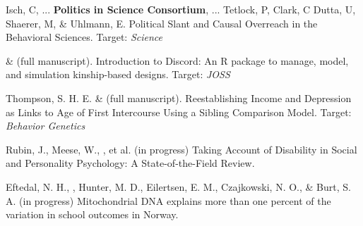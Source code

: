 \begin{etaremune}

\item  Isch, C, ... \textbf{Politics in Science Consortium}, ... Tetlock, P,  Clark, C   Dutta, U,  Shaerer, M, \&  Uhlmann, E. Political Slant and Causal Overreach in the Behavioral Sciences. Target: \textit{Science}

\item \jt \& \meb (full manuscript). Introduction to Discord: An R package to manage, model, and simulation kinship-based designs. Target: \textit{JOSS}


\item Thompson, S. H. E. \noteA \& \meb (full manuscript). Reestablishing Income and Depression as Links to Age of First Intercourse Using a Sibling Comparison Model. Target: \textit{Behavior Genetics}

\item Rubin, J., Meese, W., \meb, et al. (in progress) Taking Account of Disability in Social and Personality Psychology: A State-of-the-Field Review.

\item Eftedal, N. H., \meb, Hunter, M. D., Eilertsen, E. M., Czajkowski, N. O., \& Burt, S. A. (in progress) Mitochondrial DNA explains more than one percent of the variation in school outcomes in Norway. 




%
%







\end{etaremune}
